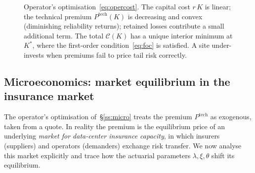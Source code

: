 \begin{figure}[ht]
\centering
{}
\caption{Operator's optimisation~\eqref{eq:opercost}. The capital cost
$r\,K$ is linear; the technical premium $P^{\mathrm{tech}}(K)$ is
decreasing and convex (diminishing reliability returns); retained
losses contribute a small additional term. The total
$\mathcal{C}(K)$ has a unique interior minimum at $K^*$, where the
first-order condition~\eqref{eq:foc} is satisfied. A site
under-invests when premiums fail to price tail risk correctly.}
\label{fig:micro}
\end{figure}

\subsection{Microeconomics: market equilibrium in the insurance market}\label{ss:supdem}

The operator's optimisation of~\S\ref{ss:micro} treats the premium
$P^{\mathrm{tech}}$ as exogenous, taken from a quote. In reality the
premium is the equilibrium price of an underlying \emph{market for
data-center insurance capacity}, in which insurers (suppliers) and
operators (demanders) exchange risk transfer. We now analyse this
market explicitly and trace how the actuarial parameters
$\lambda,\xi,\theta$ shift its equilibrium.


